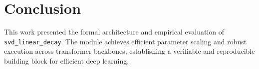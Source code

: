 \section{Conclusion}
This work presented the formal architecture and empirical evaluation of \texttt{svd_linear_decay}. The module achieves efficient parameter scaling and robust execution across transformer backbones, establishing a verifiable and reproducible building block for efficient deep learning.
